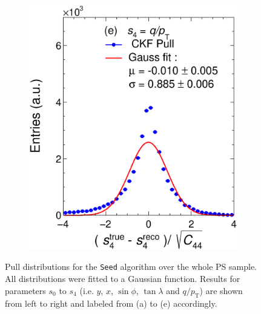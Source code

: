 \begin{figure}[t]
\begin{subfigure}{0.32\textwidth}
         \includegraphics[width=\textwidth]{figures/ch5-KF_NDGAr/FullSample/Int/Units/Unit4Seed.eps}
         \caption{}
         \label{fig:resp4SeedGAr_Int}
     \end{subfigure}
        \caption{Pull distributions for the \texttt{Seed} algorithm over the whole PS sample. All distributions were fitted to a Gaussian function. Results for parameters $s_0$ to $s_4$ (i.e. $y$, $x$, $\sin\phi$, $\tan\lambda$ and $q/p_{\text{T}}$) are shown from left to right and labeled from (a) to (e) accordingly. }
        \label{fig:UnitGAr_Int}
\end{figure}

